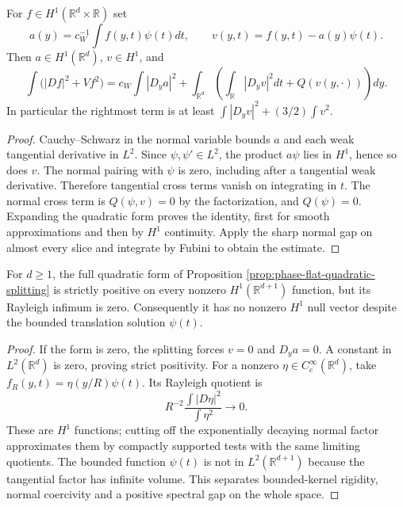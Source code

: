 \begin{proposition}\label{prop:phase-flat-quadratic-splitting}
For $f\in H^1(\mathbb R^d\times\mathbb R)$ set
\[
 a(y)=c_W^{-1}\int f(y,t)\psi(t)dt,\qquad v(y,t)=f(y,t)-a(y)\psi(t).
\]
Then $a\in H^1(\mathbb R^d)$, $v\in H^1$, and
\[
 \int\bigl(|Df|^2+Vf^2\bigr)
 =c_W\int|D_ya|^2+
 \int_{\mathbb R^d}\left(\int_{\mathbb R}|D_yv|^2dt+Q(v(y,\cdot))\right)dy.
\]
In particular the rightmost term is at least
$\int|D_yv|^2+(3/2)\int v^2$.
\end{proposition}
\begin{proof}
Cauchy--Schwarz in the normal variable bounds $a$ and each weak tangential derivative in $L^2$. Since $\psi,\psi'\in L^2$, the product $a\psi$ lies in $H^1$, hence so does $v$. The normal pairing with $\psi$ is zero, including after a tangential weak derivative. Therefore tangential cross terms vanish on integrating in $t$. The normal cross term is $Q(\psi,v)=0$ by the factorization, and $Q(\psi)=0$. Expanding the quadratic form proves the identity, first for smooth approximations and then by $H^1$ continuity. Apply the sharp normal gap on almost every slice and integrate by Fubini to obtain the estimate.
\end{proof}

\begin{example}\label{ex:phase-flat-zero-spectral-bottom}
For $d\geq1$, the full quadratic form of Proposition \ref{prop:phase-flat-quadratic-splitting} is strictly positive on every nonzero $H^1(\mathbb R^{d+1})$ function, but its Rayleigh infimum is zero. Consequently it has no nonzero $H^1$ null vector despite the bounded translation solution $\psi(t)$.
\end{example}
\begin{proof}
If the form is zero, the splitting forces $v=0$ and $D_ya=0$. A constant in $L^2(\mathbb R^d)$ is zero, proving strict positivity. For a nonzero $\eta\in C_c^\infty(\mathbb R^d)$, take $f_R(y,t)=\eta(y/R)\psi(t)$. Its Rayleigh quotient is
\[
 R^{-2}\frac{\int|D\eta|^2}{\int\eta^2}\longrightarrow0.
\]
These are $H^1$ functions; cutting off the exponentially decaying normal factor approximates them by compactly supported tests with the same limiting quotients. The bounded function $\psi(t)$ is not in $L^2(\mathbb R^{d+1})$ because the tangential factor has infinite volume. This separates bounded-kernel rigidity, normal coercivity and a positive spectral gap on the whole space.
\end{proof}
